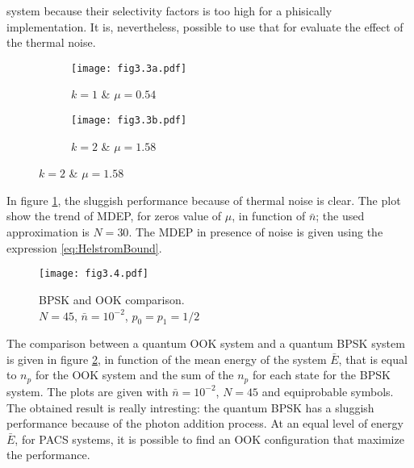     system because their selectivity factors is too high for a phisically implementation. It is, 
    nevertheless, possible to use that for evaluate the effect of the thermal noise.
    \begin{figure}[ht]
        \caption{Thermal noise effect, in corrispondence of MDEP zeros ($N=40$).}
        \begin{subfigure}{0.49\textwidth}
            \texttt{[image: fig3.3a.pdf]}
            \caption{$k=1$ \& $\mu = 0.54$}
        \end{subfigure}
        \begin{subfigure}{0.49\textwidth}
            \texttt{[image: fig3.3b.pdf]}
            \caption{$k=2$ \& $\mu = 1.58$}
        \end{subfigure}
        \label{fig:3.3}
    \end{figure}
    In figure \ref{fig:3.3}, the sluggish performance because of thermal noise is clear. The plot
    show the trend of MDEP, for zeros value of $\mu$, in function of $\bar{n}$; the used approximation
    is $N=30$. The MDEP in presence of noise is given using the expression \ref{eq:HelstromBound}.

    \begin{figure}[ht]
        \texttt{[image: fig3.4.pdf]}
        \caption{BPSK and OOK comparison. \\$N=45$, $\bar{n}=10^{-2}$, $p_0=p_1=1/2$}
        \label{fig:3.4}
    \end{figure}
    The comparison between a quantum OOK system and a quantum BPSK system is given in figure 
    \ref{fig:3.4}, in function of the mean energy of the system $\bar{E}$, that is equal to
    $n_p$ for the OOK system and the sum of the $n_p$ for each state for the BPSK system.
    The plots are given with $\bar{n}= 10^{-2}$, $N=45$ and equiprobable symbols.
    The obtained result is really intresting: the quantum BPSK has a sluggish performance because
    of the photon addition process. At an equal level of energy $\bar{E}$, for PACS systems, it is
    possible to find an OOK configuration that maximize the performance.
    